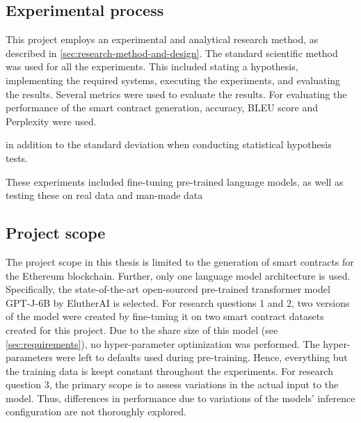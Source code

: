 \subsection{Experimental process}
\label{sec:experimental-process}
This project employs an experimental and analytical research method, as described in \cref{sec:research-method-and-design}. The standard scientific method was used for all the experiments. This included stating a hypothesis, implementing the required systems, executing the experiments, and evaluating the results. Several metrics were used to evaluate the results. For evaluating the performance of the smart contract generation, accuracy, BLEU score and Perplexity were used. 

in addition to the standard deviation when conducting statistical hypothesis tests.

These experiments included fine-tuning pre-trained language models, as well as testing these on real data and man-made data

\subsection{Project scope}
\label{sec:project-scope}

The project scope in this thesis is limited to the generation of smart contracts for the Ethereum blockchain. Further, only one language model architecture is used. Specifically, the state-of-the-art open-sourced pre-trained transformer model GPT-J-6B by ElutherAI is selected. For research questions 1 and 2, two versions of the model were created by fine-tuning it on two smart contract datasets created for this project. Due to the share size of this model (see \cref{sec:requirements}), no hyper-parameter optimization was performed. The hyper-parameters were left to defaults used during pre-training. Hence, everything but the training data is keept constant throughout the experiments. For research question 3, the primary scope is to assess variations in the actual input to the model. Thus, differences in performance due to variations of the models' inference configuration are not thoroughly explored.
